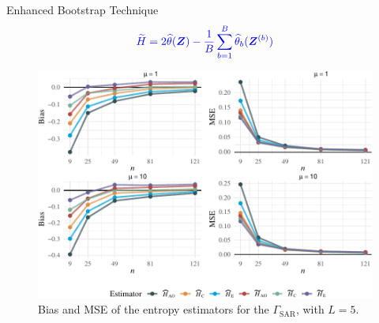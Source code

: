 \documentclass[aspectratio=1610,10pt]{beamer}
\begin{document}
\begin{frame}
\begin{columns}[T,onlytextwidth]
  \pause  
\begin{column}{.48\textwidth}\vspace{-0.1cm}
\begin{exampleblock}{Enhanced Bootstrap Technique}
        \begin{align*}
\textcolor[rgb]{0,0,1}{\widetilde{H} = 2\widehat{\theta}(\bm{Z}) - \frac{1}{B}\sum_{b=1}^B \widehat{\theta}_b(\bm{Z}^{(b)})}
\end{align*} 
      \end{exampleblock}
					     \begin{block}{} \vspace{-0.8cm}
		\justifying
				\begin{figure}[H]
{\centering \includegraphics[width=1.0\linewidth]{../../Figures/PDF/Plot_bias_mse_gi0-2} 

}
\caption{Bias and MSE of the entropy estimators for the $\Gamma_{\text{SAR}}$, with $L=5$.}\label{fig:Plot_bias_mse_gi0}
\end{figure}


\end{block}\vspace{2.8cm}
    \end{column}
\end{columns}\vspace{0.2cm}
       

\end{frame} 
\end{document}
